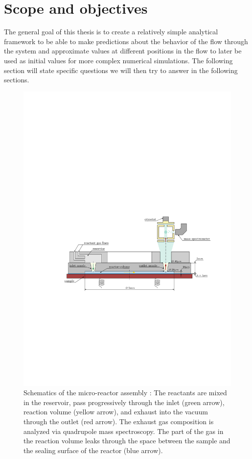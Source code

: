 \section{Scope and objectives}\label{sec:scope-objectives}
	The general goal of this thesis is to create a relatively simple analytical framework to be able to make predictions about the behavior of the flow through the system and approximate values at different positions in the flow to later be used as initial values for more complex numerical simulations.
	The following section will state specific questions we will then try to answer in the following sections.
	\begin{figure}[H]
	    \centering
	    \includegraphics[width=\textwidth]{src/02_scope-and-objectives/fig_technical-drawing.pdf}
	    \caption{Schematics of the micro-reactor assembly \cite{lagin2025poster}: The reactants are mixed in the reservoir, pass progressively through the inlet (green arrow), reaction volume (yellow arrow), and exhaust into the vacuum through the outlet (red arrow). The exhaust gas composition is analyzed via quadrupole mass spectroscopy. The part of the gas in the reaction volume leaks through the space between the sample and the sealing surface of the reactor (blue arrow).}
	    \label{fig:technical-drawing}
	\end{figure}
	

